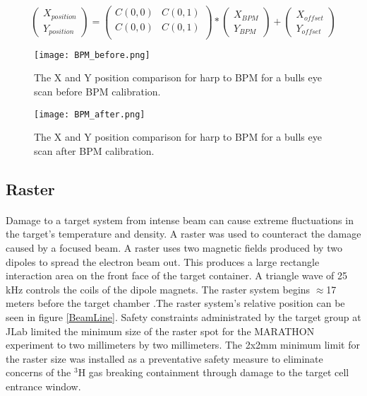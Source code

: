 		\paragraph{}
		\begin{equation}
		\label{BPM_eq}
		\begin{pmatrix}
		X_{position}\\
		Y_{position}
		\end{pmatrix}
		=
		\begin{pmatrix}
		C(0,0) & C(0,1)\\
		C(0,0) & C(0,1)\\
		\end{pmatrix}
		*
		\begin{pmatrix}
		X_{BPM}\\
		Y_{BPM}
		\end{pmatrix}
		+
		\begin{pmatrix}
		X_{offset}\\
		Y_{offset}
		\end{pmatrix}			 
		\end{equation}

		\begin{figure}[]
			\centering
			\texttt{[image: BPM\_before.png]} 
			\caption{The X and Y position comparison for harp to BPM for a bulls eye scan before BPM calibration. }
			\label{bullsB}
			\centering
			\texttt{[image: BPM\_after.png]} 
			\caption{The X and Y position comparison for harp to BPM for a bulls eye scan after BPM calibration. }
			\label{bulls}
		\end{figure} 	

	 \subsection{Raster}
	
	 \paragraph{}Damage to a target system from intense beam can cause extreme fluctuations in the target's temperature and density. A raster was used to counteract the damage caused by a focused beam. A raster uses two magnetic fields produced by two dipoles to spread the electron beam out. This produces a large rectangle interaction area on the front face of the target container. A triangle wave of 25 kHz controls the coils of the dipole magnets. The raster system begins $\approx$17 meters before the target chamber \cite{BPM2}.The raster system's relative position can be seen in figure \ref{BeamLine}. Safety constraints administrated by the target group at JLab limited the minimum size of the raster spot for the MARATHON experiment to two millimeters by two millimeters. The 2x2mm minimum limit for the raster size was installed as a preventative safety measure to eliminate concerns of the $^3$H gas breaking containment through damage to the target cell entrance window. 

